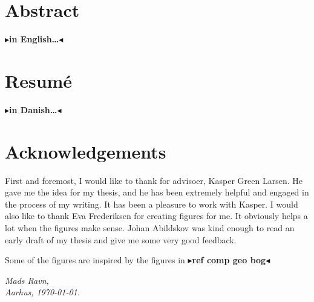 \documentclass[twoside,11pt,openright]{report}
\newcommand{\todo}[1]{{\color[rgb]{.5,0,0}\textbf{$\blacktriangleright$#1$\blacktriangleleft$}}}
\begin{document}
\pagestyle{empty} 
\vspace*{\fill}
\clearpage


\pagestyle{plain}
\chapter*{Abstract}

\todo{in English\dots}

\chapter*{Resum\'e}

\todo{in Danish\dots}

\chapter*{Acknowledgements}

First and foremost, I would like to thank for advisoer, Kasper Green Larsen. He gave me the idea for my thesis, and he has been extremely helpful and engaged in the process of my writing. It has been a pleasure to work with Kasper.
I would also like to thank Eva Frederiksen for creating figures for me. It obviously helps a lot when the figures make sense. Johan Abildskov was kind enough to read an early draft of my thesis and give me some very good feedback.

Some of the figures are inspired by the figures in \todo{ref comp geo bog}

\vspace{2ex}
\begin{flushright}
  \emph{Mads Ravn,}\\
  \emph{Aarhus, \today.}
\end{flushright}
\end{document}
